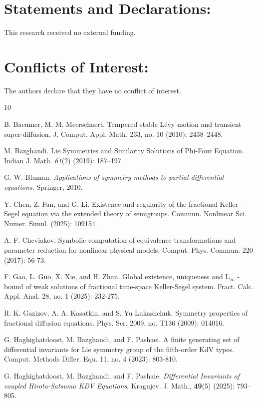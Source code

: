 \documentclass{article}
\begin{document}
\section{Statements and Declarations:}
This research received no external funding.
\section{Conflicts of Interest:}
The authors declare that they have no conflict of interest.
\begin{thebibliography}{10}

B. Baeumer, M. M. Meerschaert. Tempered stable L\'evy motion and transient super-diffusion. J. Comput. Appl. Math. 233, no. 10 (2010): 2438--2448.

M. Bazghandi. { Lie Symmetries and Similarity Solutions of Phi-Four Equation.} Indian J. Math. {\em 61}(2) (2019): 187--197.

G. W. Bluman. {\em Applications of symmetry methods to partial differential equations.} Springer, 2010.

Y. Chen, Z. Fan, and G. Li. Existence and regularity of the fractional Keller--Segel equation via the extended theory of semigroups. Commun. Nonlinear Sci. Numer. Simul. (2025): 109154.

A. F. Cheviakov. Symbolic computation of equivalence transformations and parameter reduction for nonlinear physical models. Comput. Phys. Commun. 220 (2017): 56-73.

F. Gao, L. Guo, X. Xie, and H. Zhan. Global existence, uniqueness and L$_\infty$ -bound of weak solutions of fractional time-space Keller-Segel system. Fract. Calc. Appl. Anal. 28, no. 1 (2025): 232-275.

R. K. Gazizov, A. A. Kasatkin, and S. Yu Lukashchuk. Symmetry properties of fractional diffusion equations. Phys. Scr. 2009, no. T136 (2009): 014016.

G. Haghighatdoost, M. Bazghandi, and F. Pashaei. A finite generating set of differential invariants for Lie symmetry group of the fifth-order KdV types. Comput. Methods Differ. Equ. 11, no. 4 (2023): 803-810.

G. Haghighatdoost, M. Bazghandi, and F. Pashaie. {\it Differential Invariants of coupled Hirota-Satsuma KDV Equations}, Kragujev. J. Math., {\bf 49}(5) (2025): 793--805.


\end{thebibliography}
\end{document}
